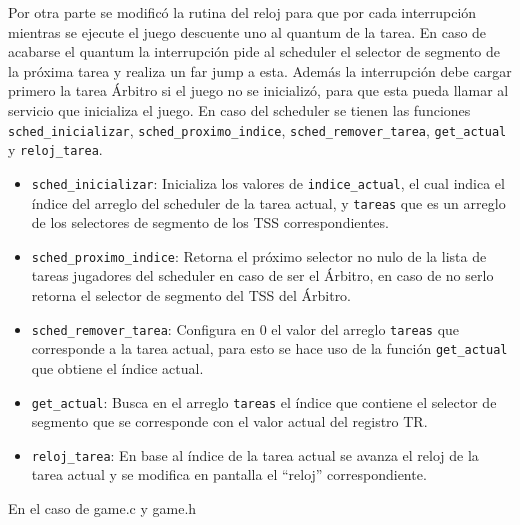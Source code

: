 \documentclass[10pt, a4paper]{article}
\begin{document}
Por otra parte se modific\'o la rutina del reloj para que por cada interrupci\'on mientras se ejecute el juego descuente uno al quantum de la tarea. En caso de acabarse el quantum la interrupci\'on pide al scheduler el selector de segmento de la pr\'oxima tarea y realiza un far jump a esta. Adem\'as la interrupci\'on debe cargar primero la tarea \'Arbitro si el juego no se inicializ\'o, para que esta pueda llamar al servicio que inicializa el juego.\newline
En caso del scheduler se tienen las funciones \verb+sched_inicializar+, \verb+sched_proximo_indice+, \verb+sched_remover_tarea+, \verb+get_actual+ y \verb+reloj_tarea+.
\begin{itemize}
	\item \verb+sched_inicializar+: Inicializa los valores de \verb+indice_actual+, el cual indica el \'indice del arreglo del scheduler de la tarea actual, y \verb+tareas+ que es un arreglo de los selectores de segmento de los TSS correspondientes.
	\item \verb+sched_proximo_indice+: Retorna el pr\'oximo selector no nulo de la lista de tareas jugadores del scheduler en caso de ser el \'Arbitro, en caso de no serlo retorna el selector de segmento del TSS del \'Arbitro.
	\item \verb+sched_remover_tarea+: Configura en $0$ el valor del arreglo \verb+tareas+ que corresponde a la tarea actual, para esto se hace uso de la funci\'on \verb+get_actual+ que obtiene el \'indice actual.
	\item \verb+get_actual+: Busca en el arreglo \verb+tareas+ el \'indice que contiene el selector de segmento que se corresponde con el valor actual del registro TR.
	\item \verb+reloj_tarea+: En base al \'indice de la tarea actual se avanza el reloj de la tarea actual y se modifica en pantalla el ``reloj'' correspondiente.
\end{itemize}

En el caso de game.c y game.h 
\end{document}
